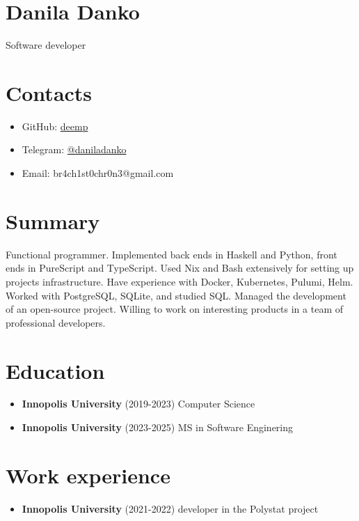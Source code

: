 \documentclass[twocolumn,11pt]{report}
\begin{document}
\section*{\huge Danila Danko}

Software developer

\section*{Contacts}
\begin{itemize}
     \item GitHub: \href{https://github.com/deemp}{deemp}
     \item Telegram: \href{https://t.me/daniladanko}{@daniladanko}
     \item Email: br4ch1st0chr0n3@gmail.com
\end{itemize}

\section*{Summary}
Functional programmer.
Implemented back ends in Haskell and Python, front ends in PureScript and TypeScript.
Used Nix and Bash extensively for setting up projects infrastructure.
Have experience with Docker, Kubernetes, Pulumi, Helm.
Worked with PostgreSQL, SQLite, and studied SQL.
Managed the development of an open-source project.
Willing to work on interesting products in a team of professional developers.


\section*{Education}
\begin{itemize}
     \item \textbf{Innopolis University} (2019-2023) \newline Computer Science

     \item \textbf{Innopolis University} (2023-2025) \newline MS in Software Enginering

\end{itemize}

\section*{Work experience}

\begin{itemize}
     \item \textbf{Innopolis University} (2021-2022) \newline developer in the Polystat project

\end{itemize}
\newpage
\end{document}

